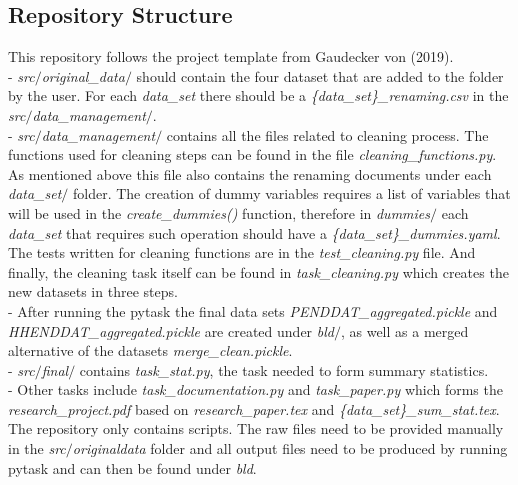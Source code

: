 \documentclass[11pt, a4paper, leqno]{article}
\begin{document}
\subsection{Repository Structure}
This repository follows the project template from Gaudecker von (2019).\\[12pt]
- \emph{src$/$original\_data$/$} should contain the four dataset that are added to the folder by the user. For each  \emph{data\_set} there should be a   \emph{\{data\_set\}\_renaming.csv} in the  \emph{src$/$data\_management$/$}.\\[12pt]
- \emph{src$/$data\_management$/$} contains all the files related to cleaning process. The functions used for cleaning steps can be found in the file  \emph{cleaning\_functions.py}. As mentioned above this file also contains the renaming documents under each  \emph{data\_set$/$} folder. The creation of dummy variables requires a list of variables that will be used in the  \emph{create\_dummies()} function, therefore in  \emph{dummies$/$} each  \emph{data\_set} that requires such operation should have a  \emph{\{data\_set\}\_dummies.yaml}. The tests written for cleaning functions are in the  \emph{test\_cleaning.py} file. And finally, the cleaning task itself can be found in  \emph{task\_cleaning.py} which creates the new datasets in three steps.\\[12pt]
- After running the pytask the final data sets \emph{PENDDAT\_aggregated.pickle} and \emph{HHENDDAT\_aggregated.pickle} are created under  \emph{bld$/$}, as well as a merged alternative of the datasets  \emph{merge\_clean.pickle}.\\[12pt]
- \emph{src$/$final$/$} contains  \emph{task\_stat.py}, the task needed to form summary statistics.\\[12pt]
- Other tasks include \emph{task\_documentation.py} and  \emph{task\_paper.py} which forms the \\  \emph{research\_project.pdf} based on \emph{research\_paper.tex} and  \emph{\{data\_set\}\_sum\_stat.tex}.\\[12pt]
The repository only contains scripts. The raw files need to be provided manually in the \emph{src$/$original\-data} folder and all output files need to be produced by running pytask and can then be found under \emph{bld}.
\end{document}
